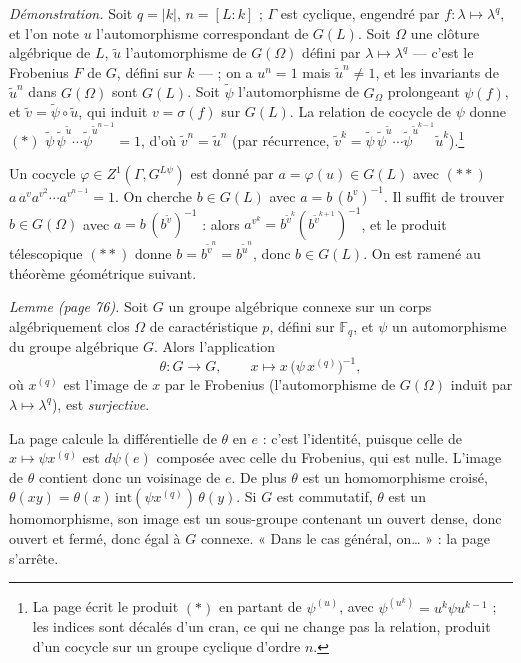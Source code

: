\documentclass[11pt,a4paper]{article}
\begin{document}
\emph{Démonstration.} Soit $q = |k|$, $n = [L:k]$ ; $\Gamma$ est cyclique,
engendré par $f : \lambda \mapsto \lambda^{q}$, et l'on note $u$
l'automorphisme correspondant de $G(L)$. Soit $\Omega$ une clôture algébrique
de $L$, $\tilde{u}$ l'automorphisme de $G(\Omega)$ défini par $\lambda \mapsto
\lambda^{q}$ — c'est le Frobenius $F$ de $G$, défini sur $k$ — ; on a $u^{n} =
1$ mais $\tilde{u}^{n} \neq 1$, et les invariants de $\tilde{u}^{n}$ dans
$G(\Omega)$ sont $G(L)$. Soit $\tilde{\psi}$ l'automorphisme de $G_{\Omega}$
prolongeant $\psi(f)$, et $\tilde{v} = \tilde{\psi} \circ \tilde{u}$, qui induit
$v = \sigma(f)$ sur $G(L)$. La relation de cocycle de $\psi$ donne $(*)$
$\tilde{\psi}\,\tilde{\psi}^{\tilde{u}} \cdots \tilde{\psi}^{\tilde{u}^{n-1}} = 1$, d'où
$\tilde{v}^{n} = \tilde{u}^{n}$ (par récurrence, $\tilde{v}^{k} =
\tilde{\psi}\,\tilde{\psi}^{\tilde{u}} \cdots \tilde{\psi}^{\tilde{u}^{k-1}}
\tilde{u}^{k}$).\footnote{La page écrit le produit $(*)$ en partant de
$\psi^{(u)}$, avec $\psi^{(u^{k})} = u^{k}\psi u^{k-1}$ ; les indices sont
décalés d'un cran, ce qui ne change pas la relation, produit d'un cocycle sur
un groupe cyclique d'ordre $n$.}

Un cocycle $\varphi \in Z^1(\Gamma, G^{L\psi})$ est donné par $a =
\varphi(u) \in G(L)$ avec $(**)$ $a\,a^{v}a^{v^{2}} \cdots a^{v^{n-1}} = 1$. On
cherche $b \in G(L)$ avec $a = b\,(b^{v})^{-1}$. Il suffit de trouver $b \in
G(\Omega)$ avec $a = b\,(b^{\tilde{v}})^{-1}$ : alors $a^{v^{k}} =
b^{\tilde{v}^{k}}(b^{\tilde{v}^{k+1}})^{-1}$, et le produit télescopique $(**)$
donne $b = b^{\tilde{v}^{n}} = b^{\tilde{u}^{n}}$, donc $b \in G(L)$. On est
ramené au théorème géométrique suivant.

\emph{Lemme (page 76).} Soit $G$ un groupe algébrique connexe sur un corps
algébriquement clos $\Omega$ de caractéristique $p$, défini sur
$\mathbb{F}_q$, et $\psi$ un automorphisme du groupe algébrique $G$. Alors
l'application
\[
\theta : G \to G, \qquad x \longmapsto x\,\bigl(\psi\,x^{(q)}\bigr)^{-1},
\]
où $x^{(q)}$ est l'image de $x$ par le Frobenius (l'automorphisme de $G(\Omega)$
induit par $\lambda \mapsto \lambda^{q}$), est \emph{surjective}.

La page calcule la différentielle de $\theta$ en $e$ : c'est l'identité,
puisque celle de $x \mapsto \psi x^{(q)}$ est $d\psi(e)$ composée avec celle du
Frobenius, qui est nulle. L'image de $\theta$ contient donc un voisinage de $e$.
De plus $\theta$ est un homomorphisme croisé, $\theta(xy) =
\theta(x)\,\mathrm{int}(\psi x^{(q)})\,\theta(y)$. Si $G$ est commutatif,
$\theta$ est un homomorphisme, son image est un sous-groupe contenant un ouvert
dense, donc ouvert et fermé, donc égal à $G$ connexe. « Dans le cas général,
on… » : la page s'arrête.
\end{document}
